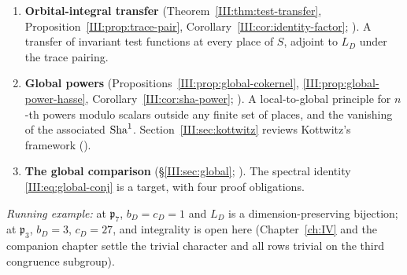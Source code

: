 \begin{enumerate}[leftmargin=*,label=\arabic*.]
\item \textbf{Orbital-integral transfer} (Theorem~\ref{III:thm:test-transfer}, Proposition~\ref{III:prop:trace-pair}, Corollary~\ref{III:cor:identity-factor}; \Ptag). A transfer of invariant test functions at every place of $S$, adjoint to $L_D$ under the trace pairing.
\item \textbf{Global powers} (Propositions~\ref{III:prop:global-cokernel}, \ref{III:prop:global-power-hasse}, Corollary~\ref{III:cor:sha-power}; \Ptag). A local-to-global principle for $n$-th powers modulo scalars outside any finite set of places, and the vanishing of the associated $\operatorname{Sha}^1$. Section~\ref{III:sec:kottwitz} reviews Kottwitz's framework (\Etag).
\item \textbf{The global comparison} (\S\ref{III:sec:global}; \Ctag). The spectral identity \eqref{III:eq:global-conj} is a target, with four proof obligations.
\end{enumerate}
\emph{Running example:} at $\mathfrak p_7$, $b_D=c_D=1$ and $L_D$ is a dimension-preserving bijection; at $\mathfrak p_3$, $b_D=3$, $c_D=27$, and integrality is open here (Chapter~\ref{ch:IV} and the companion chapter settle the trivial character and all rows trivial on the third congruence subgroup).
\endgroup
\begingroup
\providecommand{\F}{}\renewcommand{\F}{F}
\providecommand{\K}{}\renewcommand{\K}{K}
\providecommand{\A}{}\renewcommand{\A}{\mathbb A}
\providecommand{\C}{}\renewcommand{\C}{\mathbb C}
\providecommand{\Z}{}\renewcommand{\Z}{\mathbb Z}
\providecommand{\GL}{}\renewcommand{\GL}{\operatorname{GL}}
\providecommand{\Irr}{}\renewcommand{\Irr}{\operatorname{Irr}}
\providecommand{\Nrd}{}\renewcommand{\Nrd}{\operatorname{Nrd}}
\providecommand{\Nm}{}\renewcommand{\Nm}{\operatorname{N}}
\providecommand{\vol}{}\renewcommand{\vol}{\operatorname{vol}}
\providecommand{\Gal}{}\renewcommand{\Gal}{\operatorname{Gal}}
\providecommand{\Aut}{}\renewcommand{\Aut}{\operatorname{Aut}}
\providecommand{\reg}{}\renewcommand{\reg}{\mathrm{reg}}
\providecommand{\tH}{}\renewcommand{\tH}{\widetilde H}
\providecommand{\tZ}{}\renewcommand{\tZ}{\widetilde Z}
\providecommand{\tT}{}\renewcommand{\tT}{\widetilde T}
\providecommand{\Gb}{}\renewcommand{\Gb}{\overline G}
\providecommand{\GDb}{}\renewcommand{\GDb}{\overline{G_D}}
\providecommand{\Ptag}{}\renewcommand{\Ptag}{\textnormal{\textbf{(P)}}}
\providecommand{\Etag}{}\renewcommand{\Etag}{\textnormal{\textbf{(E)}}}
\providecommand{\Ctag}{}\renewcommand{\Ctag}{\textnormal{\textbf{(C)}}}
\providecommand{\Otag}{}\renewcommand{\Otag}{\textnormal{\textbf{(O)}}}
